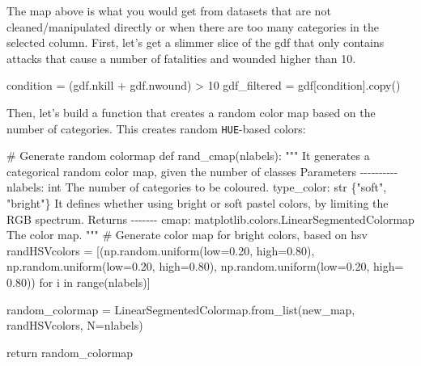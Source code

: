 \documentclass[
  letterpaper,
  DIV=11,
  numbers=noendperiod]{scrreprt}
\newenvironment{Shaded}{\begin{snugshade}}{\end{snugshade}}
\newcommand{\BuiltInTok}[1]{\textcolor[rgb]{0.00,0.23,0.31}{#1}}
\newcommand{\CommentTok}[1]{\textcolor[rgb]{0.37,0.37,0.37}{#1}}
\newcommand{\ControlFlowTok}[1]{\textcolor[rgb]{0.00,0.23,0.31}{#1}}
\newcommand{\DecValTok}[1]{\textcolor[rgb]{0.68,0.00,0.00}{#1}}
\newcommand{\FloatTok}[1]{\textcolor[rgb]{0.68,0.00,0.00}{#1}}
\newcommand{\KeywordTok}[1]{\textcolor[rgb]{0.00,0.23,0.31}{#1}}
\newcommand{\NormalTok}[1]{\textcolor[rgb]{0.00,0.23,0.31}{#1}}
\newcommand{\OperatorTok}[1]{\textcolor[rgb]{0.37,0.37,0.37}{#1}}
\newcommand{\StringTok}[1]{\textcolor[rgb]{0.13,0.47,0.30}{#1}}
\begin{document}
The map above is what you would get from datasets that are not
cleaned/manipulated directly or when there are too many categories in
the selected column. First, let's get a slimmer slice of the gdf that
only contains attacks that cause a number of fatalities and wounded
higher than 10.

\begin{Shaded}
\begin{Highlighting}[]
\NormalTok{condition }\OperatorTok{=}\NormalTok{ (gdf.nkill }\OperatorTok{+}\NormalTok{ gdf.nwound) }\OperatorTok{\textgreater{}} \DecValTok{10}
\NormalTok{gdf\_filtered }\OperatorTok{=}\NormalTok{ gdf[condition].copy()}
\end{Highlighting}
\end{Shaded}

Then, let's build a function that creates a random color map based on
the number of categories. This creates random \texttt{HUE}-based colors:

\begin{Shaded}
\begin{Highlighting}[]
\CommentTok{\# Generate random colormap}
\KeywordTok{def}\NormalTok{ rand\_cmap(nlabels):}
    \CommentTok{""" }
\CommentTok{    It generates a categorical random color map, given the number of classes}
\CommentTok{    }
\CommentTok{    Parameters}
\CommentTok{    {-}{-}{-}{-}{-}{-}{-}{-}{-}{-}}
\CommentTok{    nlabels: int}
\CommentTok{        The number of categories to be coloured.}
\CommentTok{    type\_color: str \{"soft", "bright"\} }
\CommentTok{        It defines whether using bright or soft pastel colors, by limiting the RGB spectrum.}
\CommentTok{       }
\CommentTok{    Returns}
\CommentTok{    {-}{-}{-}{-}{-}{-}{-}}
\CommentTok{    cmap: matplotlib.colors.LinearSegmentedColormap}
\CommentTok{        The color map.}
\CommentTok{    """}   
    \CommentTok{\# Generate color map for bright colors, based on hsv}
\NormalTok{    randHSVcolors }\OperatorTok{=}\NormalTok{ [(np.random.uniform(low}\OperatorTok{=}\FloatTok{0.20}\NormalTok{, high}\OperatorTok{=}\FloatTok{0.80}\NormalTok{),}
\NormalTok{                          np.random.uniform(low}\OperatorTok{=}\FloatTok{0.20}\NormalTok{, high}\OperatorTok{=}\FloatTok{0.80}\NormalTok{),}
\NormalTok{                          np.random.uniform(low}\OperatorTok{=}\FloatTok{0.20}\NormalTok{, high}\OperatorTok{=} \FloatTok{0.80}\NormalTok{)) }\ControlFlowTok{for}\NormalTok{ i }\KeywordTok{in} \BuiltInTok{range}\NormalTok{(nlabels)]}

\NormalTok{    random\_colormap }\OperatorTok{=}\NormalTok{ LinearSegmentedColormap.from\_list(}\StringTok{\textquotesingle{}new\_map\textquotesingle{}}\NormalTok{, randHSVcolors, N}\OperatorTok{=}\NormalTok{nlabels)}
   
    \ControlFlowTok{return}\NormalTok{ random\_colormap }
\end{Highlighting}
\end{Shaded}
\end{document}
